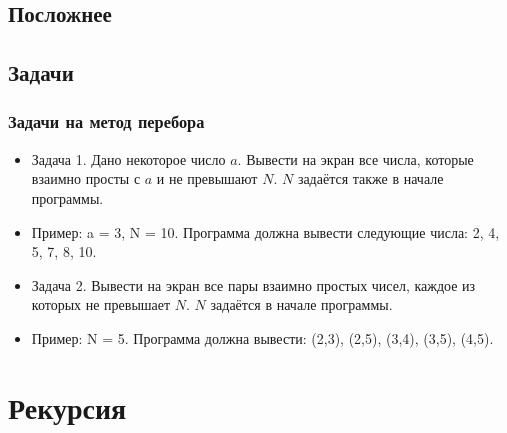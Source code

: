 \documentclass[compress,red]{beamer}
\begin{document}
\subsection{Посложнее}
\begin{frame}[fragile]
  \frametitle{Метод перебора: НОД}
  \begin{lstlisting}[label=ruby2,caption=НОД двух чисел a и b]
    def gcd(a,b)
      max = 1
      for i in 2..a
        max = i if ((a%i==0) && (b%i==0))
      end
      max
    end

    a = 126
    b = 486
    
    puts gcd(a,b)
  \end{lstlisting}}
  
\end{frame}

\subsection{Задачи}
\begin{frame}[fragile]
  \frametitle{Задачи на метод перебора}
	\begin{itemize}
	  \item Задача 1. Дано некоторое число $a$. Вывести на экран все числа, которые взаимно просты с $a$ и не превышают $N$. $N$ задаётся также в начале программы.
	  \item Пример: a = 3, N = 10. Программа должна вывести следующие числа: 2, 4, 5, 7, 8, 10.
	  \item Задача 2. Вывести на экран все пары взаимно простых чисел, каждое из которых не превышает $N$. $N$ задаётся в начале программы.
	  \item Пример: N = 5. Программа должна вывести: (2,3), (2,5), (3,4), (3,5), (4,5).
  \end{itemize}
\end{frame}

\section{Рекурсия}
\end{document}
